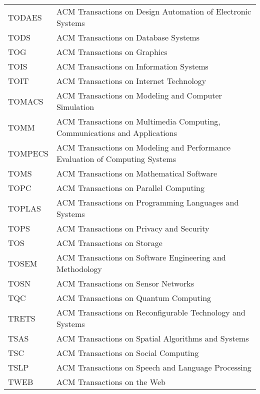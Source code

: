\begin{longtable}{>{\ttfamily}p{}@{}p{}}
     TODAES & ACM Transactions on Design Automation of Electronic Systems\\
     TODS & ACM Transactions on Database Systems\\
     TOG & ACM Transactions on Graphics\\
     TOIS & ACM Transactions on Information Systems\\
     TOIT & ACM Transactions on Internet Technology\\
     TOMACS & ACM Transactions on Modeling and Computer Simulation \\
     TOMM  & ACM Transactions on Multimedia Computing, Communications
     and Applications \\
     TOMPECS & ACM Transactions on Modeling and Performance Evaluation
     of Computing Systems\\
     TOMS & ACM Transactions on Mathematical Software\\
     TOPC & ACM Transactions on Parallel Computing\\
     TOPLAS & ACM Transactions on Programming Languages and Systems\\
     TOPS & ACM Transactions on Privacy and Security\\
     TOS & ACM Transactions on Storage\\
     TOSEM & ACM Transactions on Software Engineering and Methodology\\
     TOSN & ACM Transactions on Sensor Networks\\
     TQC & ACM Transactions on Quantum Computing\\
     TRETS & ACM Transactions on Reconfigurable Technology and Systems\\
     TSAS & ACM Transactions on Spatial Algorithms and Systems\\
     TSC & ACM Transactions on Social Computing\\
     TSLP & ACM Transactions on Speech and Language Processing \\
     TWEB & ACM Transactions on the Web\\
 \end{longtable}
\egroup
\lipsum[3-4]
